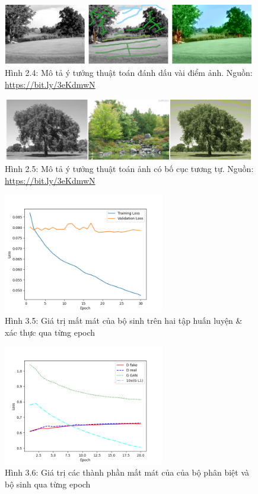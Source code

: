 \documentclass[a4paper]{article}
\begin{document}
\begin{figure}[h!]
\centering
\includegraphics[width=11cm]{images/2_4.png}
\caption*{Hình 2.4: Mô tả ý tưởng thuật toán đánh dấu vài điểm ảnh. Nguồn: \href{https://bit.ly/3eKdmwN}{https://bit.ly/3eKdmwN}}
\end{figure}

\begin{figure}[h!]
\centering
\includegraphics[width=11cm]{images/2_5.png}
\caption*{Hình 2.5: Mô tả ý tưởng thuật toán ảnh có bố cục tương tự. Nguồn: \href{https://bit.ly/3eKdmwN}{https://bit.ly/3eKdmwN}}
\end{figure}

\begin{figure}[h!]
\centering
\includegraphics[width=7cm]{images/3_5.png}
\caption*{Hình 3.5: Giá trị mất mát của bộ sinh trên hai tập huấn luyện \& xác thực qua từng epoch}
\end{figure}

\begin{figure}[h!]
\centering
\includegraphics[width=7cm]{images/3_6.png}
\caption*{Hình 3.6: Giá trị các thành phần mất mát của của bộ phân biệt và bộ sinh qua từng epoch}
\end{figure}
\end{document}
